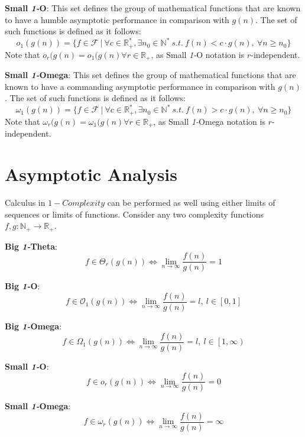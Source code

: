 \begin{definition}
\textbf{Small \textit{1-}O}:
  This set defines the group of mathematical functions that are known to have a humble
 asymptotic performance in comparison with  $g(n)$. The set of such functions is defined as it follows:
  \[o_{1}(g(n)) = \lbrace f \in \mathcal{F}\ |\ \forall c \in \mathbb{R}^{*}_{+}, \exists n_{0} \in \mathbb{N}^{*}\ s.t.\  f(n) < c \cdot g(n),\  \forall n \geq n_{0} \rbrace\]
Note that $o_{r}(g(n) = o_{1}(g(n) \forall r\in  \mathbb{R}_{+}$, as Small \textit{1-}O  notation is $r$-independent.
\end{definition}
\begin{definition} 
\item \textbf{Small \textit{1-}Omega}:
  This set defines the group of mathematical functions that are known to have a commanding asymptotic performance in comparison with  $g(n)$.
  The set of such functions is defined as it follows:
  \[\omega_{1}(g(n)) = \lbrace f \in \mathcal{F}\ |\ \forall c \in \mathbb{R}^{*}_{+}, \exists n_{0} \in \mathbb{N}^{*}\ s.t.\  f(n) > c \cdot g(n),\  \forall n \geq n_{0} \rbrace\]
    Note that $\omega_{r}(g(n) = \omega_{1}(g(n) \forall r\in  \mathbb{R}_{+}$, as Small \textit{1-}Omega  notation is $r$-independent.
\end{definition}

\section{Asymptotic Analysis}
Calculus in $1-Complexity$ can be performed as well using either limits of sequences or limits of functions. Consider any two complexity functions $f,g:\mathbb{N}_{+}\longrightarrow\mathbb{R}_{+}$.

\begin{theorem} 
\textbf{Big \textit{1-}Theta}: 
\[ f \in \Theta_{r}(g(n)) \Leftrightarrow \lim_{n\to\infty} \dfrac{f(n)}{g(n)} = 1 \]
\end{theorem} 
\begin{theorem} 
\textbf{Big \textit{1-}O}: 
\[ f \in \mathcal{O}_{1}(g(n)) \Leftrightarrow \lim_{n\to\infty} \dfrac{f(n)}{g(n)} = l,\ l \in \left[ 0, 1 \right] \]
\end{theorem} 
\begin{theorem} 
\textbf{Big \textit{1-}Omega}: 
\[ f \in \Omega_{1}(g(n)) \Leftrightarrow \lim_{n\to\infty} \dfrac{f(n)}{g(n)} = l,\ l \in \left[ 1, \infty \right) \]
\end{theorem} 
\begin{theorem} 
\textbf{Small \textit{1-}O}:
\[ f \in o_{r}(g(n)) \Leftrightarrow \lim_{n\to\infty} \dfrac{f(n)}{g(n)} = 0 \]
\end{theorem} 
\begin{theorem} 
\textbf{Small \textit{1-}Omega}:
 \[ f \in \omega_{r}(g(n)) \Leftrightarrow \lim_{n\to\infty} \dfrac{f(n)}{g(n)} = \infty \]
\end{theorem} 




